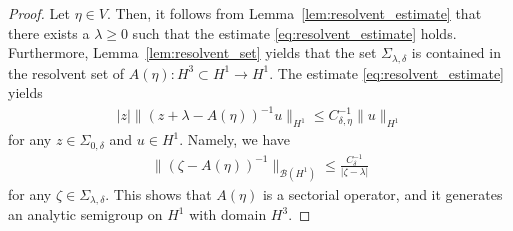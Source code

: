 \documentclass{article}
\theoremstyle{remark}
\theoremstyle{definition}
\numberwithin{equation}{section}
\begin{document}
\begin{proof}
    Let $\eta\in V$. Then, it follows from Lemma~\ref{lem:resolvent_estimate} that there exists a $\lambda\ge0$ such that the estimate \eqref{eq:resolvent_estimate} holds.
    Furthermore, Lemma~\ref{lem:resolvent_set} yields that the set $\Sigma_{\lambda,\delta}$ is contained in the resolvent set of $A(\eta)\colon H^3\subset H^1\to H^1$.
    The estimate \eqref{eq:resolvent_estimate} yields 
    \begin{align*}
        |z|\|(z+\lambda-A(\eta))^{-1}u\|_{H^1} \le C_{\delta,\eta}^{-1}\|u\|_{H^1}
    \end{align*}
    for any $z\in\Sigma_{0,\delta}$ and $u\in H^1$.
    Namely, we have
    \begin{align*}
        \|(\zeta-A(\eta))^{-1}\|_{\mathcal{B}(H^1)} \le \frac{C_\delta^{-1}}{|\zeta-\lambda|}
    \end{align*}
    for any $\zeta\in\Sigma_{\lambda,\delta}$.
    This shows that $A(\eta)$ is a sectorial operator, and it generates an analytic semigroup on $H^1$ with domain $H^3$.
\end{proof}
\end{document}

